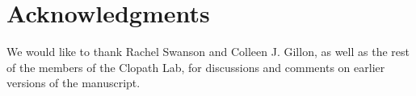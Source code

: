 \documentclass{article}
\begin{document}

\section*{Acknowledgments}
We would like to thank Rachel Swanson and Colleen J. Gillon, as well as the rest of the members of the Clopath Lab, for discussions and  comments on earlier versions of the manuscript.
\end{document}
